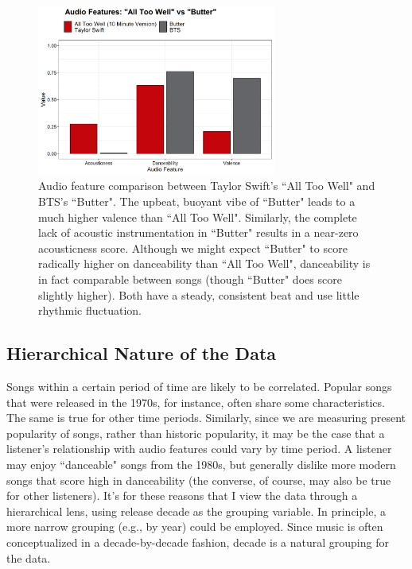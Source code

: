 \documentclass[12pt, twoside]{article}
\begin{document}
\begin{figure}[H] 
\centering
\includegraphics[width=0.7\textwidth]{alltoowell_v_butter.png}
\caption{Audio feature comparison between Taylor Swift's ``All Too Well" and BTS's ``Butter". The upbeat, buoyant vibe of ``Butter" leads to a much higher valence than ``All Too Well". Similarly, the complete lack of acoustic instrumentation in ``Butter" results in a near-zero acousticness score. Although we might expect ``Butter" to score radically higher on danceability than ``All Too Well", danceability is in fact comparable between songs (though ``Butter" does score slightly higher). Both have a steady, consistent beat and use little rhythmic fluctuation.}
\label{fig:alltoowell_vs_butter} 
\end{figure}

\subsection{Hierarchical Nature of the Data}
Songs within a certain period of time are likely to be correlated. Popular songs that were released in the 1970s, for instance, often share some characteristics. The same is true for other time periods. Similarly, since we are measuring present popularity of songs, rather than historic popularity, it may be the case that a listener's relationship with audio features could vary by time period. A listener may enjoy ``danceable" songs from the 1980s, but generally dislike more modern songs that score high in danceability (the converse, of course, may also be true for other listeners). It's for these reasons that I view the data through a hierarchical lens, using release decade as the grouping variable. In principle, a more narrow grouping (e.g., by year) could be employed. Since music is often conceptualized in a decade-by-decade fashion, decade is a natural grouping for the data.
\end{document}
